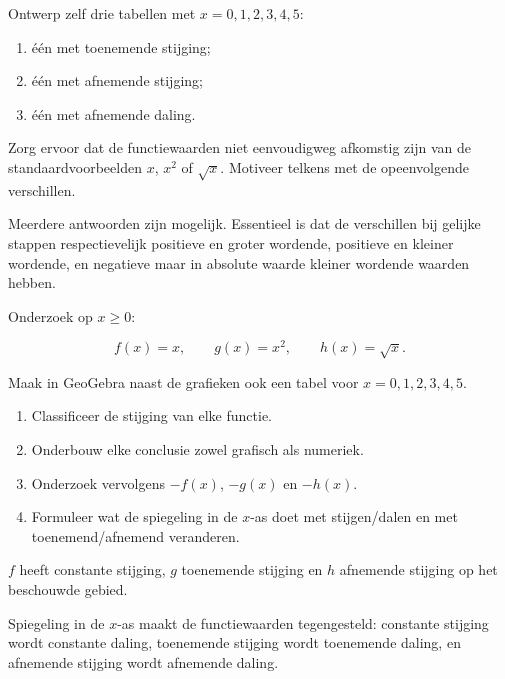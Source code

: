\documentclass{ximera}
\begin{document}
\begin{oefening}{\oefG}

Ontwerp zelf drie tabellen met \(x=0,1,2,3,4,5\):
\begin{enumerate}
  \item één met toenemende stijging;
  \item één met afnemende stijging;
  \item één met afnemende daling.
\end{enumerate}

Zorg ervoor dat de functiewaarden niet eenvoudigweg afkomstig zijn van de
standaardvoorbeelden \(x\), \(x^2\) of \(\sqrt{x}\).
Motiveer telkens met de opeenvolgende verschillen.

\begin{oplossing}
Meerdere antwoorden zijn mogelijk. Essentieel is dat de verschillen bij gelijke
stappen respectievelijk positieve en groter wordende, positieve en kleiner wordende,
en negatieve maar in absolute waarde kleiner wordende waarden hebben.
\end{oplossing}

\end{oefening}


\begin{oefening}{\oefG}

Onderzoek op \(x\geq0\):

\[
f(x)=x,\qquad
g(x)=x^2,\qquad
h(x)=\sqrt{x}.
\]

Maak in GeoGebra naast de grafieken ook een tabel voor
\(x=0,1,2,3,4,5\).

\begin{enumerate}
  \item Classificeer de stijging van elke functie.
  \item Onderbouw elke conclusie zowel grafisch als numeriek.
  \item Onderzoek vervolgens \(-f(x)\), \(-g(x)\) en \(-h(x)\).
  \item Formuleer wat de spiegeling in de \(x\)-as doet met
        stijgen/dalen en met toenemend/afnemend veranderen.
\end{enumerate}

\begin{oplossing}
\(f\) heeft constante stijging, \(g\) toenemende stijging en \(h\)
afnemende stijging op het beschouwde gebied.

Spiegeling in de \(x\)-as maakt de functiewaarden tegengesteld:
constante stijging wordt constante daling,
toenemende stijging wordt toenemende daling,
en afnemende stijging wordt afnemende daling.
\end{oplossing}

\end{oefening}


\end{document}
